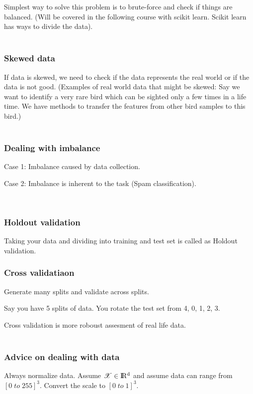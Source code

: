 \documentclass{article}
\begin{document}
Simplest way to solve this problem is to brute-force and check if things are balanced.  (Will be covered in the following course with scikit learn.  Scikit learn has ways to divide the data).\\\\
\subsubsection*{Skewed data}
If data is skewed, we need to check if the data represents the real world or if the data is not good.  (Examples of real world data that might be skewed:  Say we want to identify a very rare bird which can be sighted only a few times in a life time.  We have methods to transfer the features from other bird samples to this bird.)\\\\
\subsubsection*{Dealing with imbalance}
\begin{description}
	\item{Case 1}:  Imbalance caused by data collection.
	\item{Case 2}:  Imbalance is inherent to the task (Spam classification).
\end{description}
\
\subsubsection*{Holdout validation}
Taking your data and dividing into training and test set is called as Holdout validation.
\
\subsubsection*{Cross validatiaon}
Generate many splits and validate across splits.

Say you have 5 splits of data.  You rotate the test set from 4, 0, 1, 2, 3.

Cross validation is more roboust assesment of real life data.\\\\
\subsubsection*{Advice on dealing with data}
Always normalize data.
Assume \( \mathcal{X} \in \rm I\!R^{d}\) and assume data can range from \([0\; to\; 255]^{3} \).  Convert the scale to \([0\; to\; 1]^{3} \).
\end{document}
